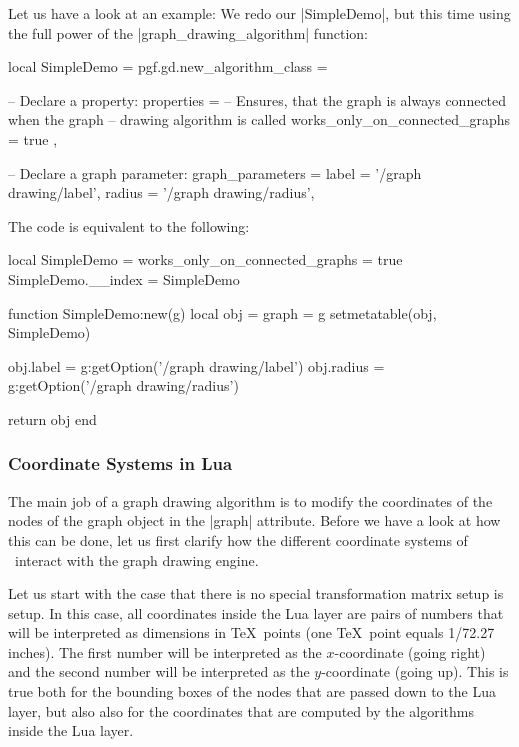 Let us have a look at an example: We redo our |SimpleDemo|, but this
time using the full power of the |graph_drawing_algorithm| function:

\begin{codeexample}
local SimpleDemo = pgf.gd.new_algorithm_class = {
  
  -- Declare a property:
  properties = {
    -- Ensures, that the graph is always connected when the graph
    -- drawing algorithm is called
    works_only_on_connected_graphs = true
  },

  -- Declare a graph parameter:
  graph_parameters = {
    label  = '/graph drawing/label',
    radius = '/graph drawing/radius',
  }
}
\end{codeexample}

The code is equivalent to the following:
\begin{codeexample}
local SimpleDemo = { works_only_on_connected_graphs = true }
SimpleDemo.__index = SimpleDemo

function SimpleDemo:new(g)
  local obj = { graph = g }
  setmetatable(obj, SimpleDemo)
  
  obj.label  = g:getOption('/graph drawing/label')
  obj.radius = g:getOption('/graph drawing/radius')
  
  return obj  
end  
\end{codeexample}



\subsubsection{Coordinate Systems in Lua}

\label{section-gd-lua-coordinates}

The main job of a graph drawing algorithm is to modify the
coordinates of the nodes of the graph object in the |graph|
attribute. Before we have a look at how this can be done, let us 
first clarify how the different coordinate systems of \pgfname\
interact with the graph drawing engine.

Let us start with the case that there is no special transformation
matrix setup is setup. In this case, all coordinates inside the Lua
layer are pairs of numbers that will be interpreted as dimensions in
\TeX\ points (one \TeX\ point equals 1/72.27 inches). The first number
will be interpreted as the $x$-coordinate (going right) and the second
number will be interpreted as the $y$-coordinate (going up). This is
true both for the bounding boxes of the nodes that are passed down to
the Lua layer, but also also for the coordinates that are computed by
the algorithms inside the Lua layer.


